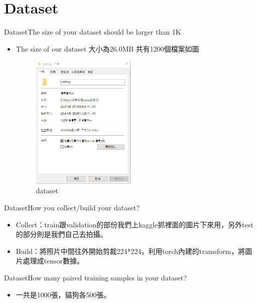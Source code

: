 \documentclass{beamer}
\begin{document}
\section{Dataset}


\begin{frame}{Dataset}{The size of your dataset should be larger than 1K }
\begin{CJK*}{UTF8}{bsmi}
  \begin{itemize}
  \item {
The size of our dataset 大小為26.0MB 共有1200個檔案如圖\\
\begin{figure}[h]
\begin{center}
\includegraphics[width=5cm]{dataset.jpg} 
\end{center} 
\label{fig:1} 
\caption{dataset } 
\end{figure}
  }
  \end{itemize}
\end{CJK*}
\end{frame}

\begin{frame}{Dataset}{How you collect/build your dataset?}
\begin{CJK*}{UTF8}{bsmi}
  \begin{itemize}
  \item {
    Collect：train跟validation的部份我們上kaggle抓裡面的圖片下來用，另外test的部分則是我們自己去拍攝。
  }
  \item {
    Build：將照片中間往外開始剪裁224*224，利用torch內建的tramsform，將圖片處理成tensor數據。
  }
  \end{itemize}
\end{CJK*}
\end{frame}

\begin{frame}{Dataset}{How many paired training samples in your dataset?}
\begin{CJK*}{UTF8}{bsmi}
  \begin{itemize}
  \item {
    一共是1000張，貓狗各500張。
  }
  \end{itemize}
\end{CJK*}
\end{frame}
\end{document}
